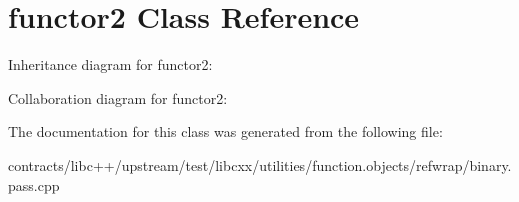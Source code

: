 \hypertarget{classfunctor2}{}\section{functor2 Class Reference}
\label{classfunctor2}


Inheritance diagram for functor2\+:


Collaboration diagram for functor2\+:


The documentation for this class was generated from the following file\+:\begin{DoxyCompactItemize}
\item 
contracts/libc++/upstream/test/libcxx/utilities/function.\+objects/refwrap/binary.\+pass.\+cpp\end{DoxyCompactItemize}
